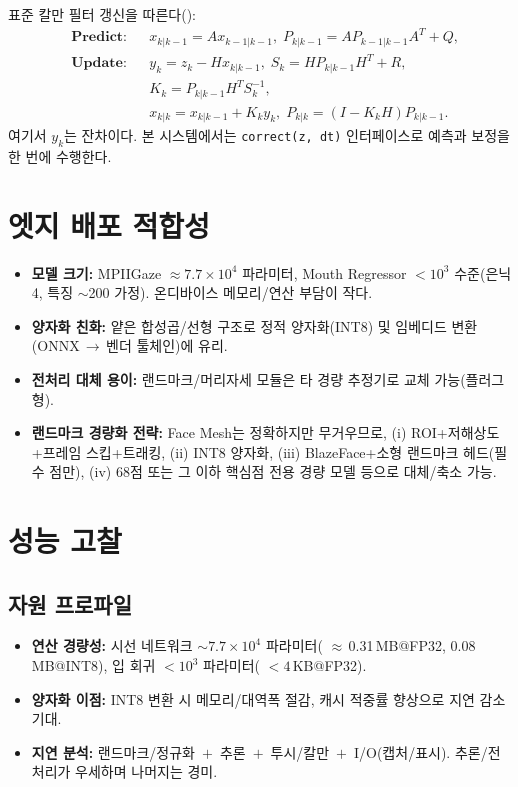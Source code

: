 \documentclass[10pt,a4paper]{article}
\begin{document}
표준 칼만 필터 갱신을 따른다(\cite{Kalman1960,WelchBishop2006}):
\begin{align}
  &\textbf{Predict:} && x_{k|k-1}=A x_{k-1|k-1},\; P_{k|k-1}=A P_{k-1|k-1}A^T+Q, \\
  &\textbf{Update:}  && y_k = z_k - H x_{k|k-1},\; S_k = H P_{k|k-1}H^T + R,\\
  &&& K_k = P_{k|k-1}H^T S_k^{-1},\\
  &&& x_{k|k} = x_{k|k-1} + K_k y_k,\; P_{k|k} = (I-K_k H)P_{k|k-1}.
\end{align}
여기서 $y_k$는 잔차이다. 본 시스템에서는 \texttt{correct(z, dt)} 인터페이스로 예측과 보정을 한 번에 수행한다.


\section{엣지 배포 적합성}
\begin{itemize}
  \item \textbf{모델 크기:} MPIIGaze $\approx 7.7\times10^4$ 파라미터, Mouth Regressor $<10^3$ 수준(은닉 4, 특징 $\sim$200 가정). 온디바이스 메모리/연산 부담이 작다.
  \item \textbf{양자화 친화:} 얕은 합성곱/선형 구조로 정적 양자화(INT8) 및 임베디드 변환(ONNX\,$\to$\,벤더 툴체인)에 유리.
  \item \textbf{전처리 대체 용이:} 랜드마크/머리자세 모듈은 타 경량 추정기로 교체 가능(플러그형).
  \item \textbf{랜드마크 경량화 전략:} Face Mesh는 정확하지만 무거우므로, (i) ROI+저해상도+프레임 스킵+트래킹, (ii) INT8 양자화, (iii) BlazeFace+소형 랜드마크 헤드(필수 점만), (iv) 68점 또는 그 이하 핵심점 전용 경량 모델 등으로 대체/축소 가능.
\end{itemize}

\section{성능 고찰}

\subsection{자원 프로파일}
\begin{itemize}
  \item \textbf{연산 경량성:} 시선 네트워크 $\sim7.7\times10^4$ 파라미터(\,\,$\approx$\,0.31\,MB@FP32, 0.08\,MB@INT8), 입 회귀 $<10^3$ 파라미터(\,\,$<4$\,KB@FP32).
  \item \textbf{양자화 이점:} INT8 변환 시 메모리/대역폭 절감, 캐시 적중률 향상으로 지연 감소 기대.
  \item \textbf{지연 분석:} 랜드마크/정규화 \,$+$\, 추론 \,$+$\, 투시/칼만 \,$+$\, I/O(캡처/표시). 추론/전처리가 우세하며 나머지는 경미.
\end{itemize}
\end{document}
